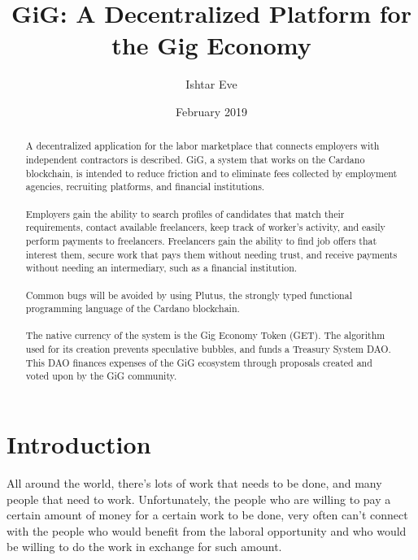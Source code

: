 \documentclass{article}
\title{GiG: A Decentralized Platform for the Gig Economy}
\author{Ishtar Eve}
\date{February 2019}
\begin{document}
   \maketitle
   \begin{abstract}
A decentralized application for the labor marketplace that connects employers with independent contractors is described. GiG, a system that works on the Cardano blockchain, is intended to reduce friction and to eliminate fees collected by employment agencies, recruiting platforms, and financial institutions. 

\paragraph{}Employers gain the ability to search profiles of candidates that match their requirements, contact available freelancers, keep track of worker's activity, and easily perform payments to freelancers. Freelancers gain the ability to find job offers that interest them, secure work that pays them without needing trust, and receive payments without needing an intermediary, such as a financial institution.

\paragraph{} Common bugs will be avoided by using Plutus, the strongly typed functional programming language of the Cardano blockchain.

\paragraph{} The native currency of the system is the Gig Economy Token (GET). The algorithm used for its creation prevents speculative bubbles, and funds a Treasury System DAO. This DAO finances expenses of the GiG ecosystem through proposals created and voted upon by the GiG community.
\end{abstract}

\section{Introduction}   
All around the world, there's lots of work that needs to be done, and many people that need to work. Unfortunately, the people who are willing to pay a certain amount of money for a certain work to be done, very often can't connect with the people who would benefit from the laboral opportunity and who would be willing to do the work in exchange for such amount.
\end{document}
